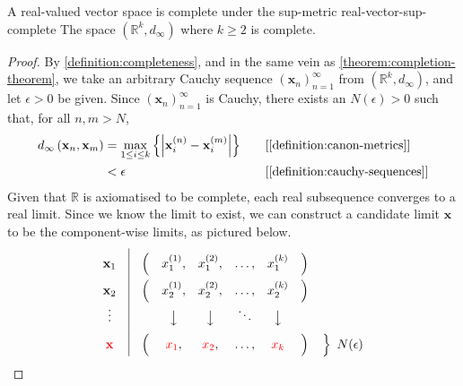 \documentclass{article}
\renewcommand*\vec{\mathbf}
\numberwithin{equation}{section}
\numberwithin{figure}{section}
\begin{document}
\begin{theorem}{A real-valued vector space is complete under the sup-metric}
            {real-vector-sup-complete}
    The space $ \left( \mathbb{R}^k, d_\infty \right) $ where $ k \geq 2 $ is
    complete.
    \begin{proof}
        By \cref{definition:completeness}, and in the same vein as
        \cref{theorem:completion-theorem}, we take an arbitrary Cauchy sequence
        $ \left( \vec{x}_n \right)_{n=1}^\infty $ from $ \left( \mathbb{R}^k,
        d_\infty \right) $, and let $ \epsilon > 0 $ be given. Since $ \left(
        \vec{x}_n \right)_{n=1}^\infty $ is Cauchy,
        there exists an $ N(\epsilon) > 0 $ such that, for all $ n, m > N $,
        \begin{alignat}{2}
            d_\infty\left( \vec{x}_n, \vec{x}_m \right) &= \max_{1 \leq i \leq
            k}\left\{ \left\vert \vec{x}_i^{(n)} - \vec{x}_{i}^{(m)} \right\vert
            \right\}\quad &&\text{[\Cref{definition:canon-metrics}]}\\
            &< \epsilon &&\text{[\Cref{definition:cauchy-sequences}]}
        \end{alignat}
        Given that $ \mathbb{R} $ is axiomatised to be complete, each real
        subsequence converges to a real limit. Since we know the limit to exist,
        we can construct a candidate limit $ \vec{x} $ to be the component-wise
        limits, as pictured below.
        \begin{equation*}
            \renewcommand\arraystretch{1.8}
            \begin{matrix}
                \vec{x}_1 & \vline & \Big( & x_1^{(1)}, & x_1^{(2)}, & \ldots,
                    & x_1^{(k)} & \Big) \\
                \vec{x}_2 & \vline & \Big( & x_2^{(1)}, & x_2^{(2)}, & \ldots,
                    & x_2^{(k)} & \Big) \\
                \vdots & \vline & & \big\downarrow & \big\downarrow & \ddots &
                    \big\downarrow & \\
                \color{red}{\vec{x}} & \vline & \Big( & {\color{red}x_1}, &
                    {\color{red}x_2}, & \ldots, & {\color{red}x_k} & \Big) &
                    \begin{rcases}\vphantom{\Big)}\end{rcases}\,\,N(\epsilon)
            \end{matrix}
        \end{equation*}


\end{proof}
\end{theorem}
\end{document}
